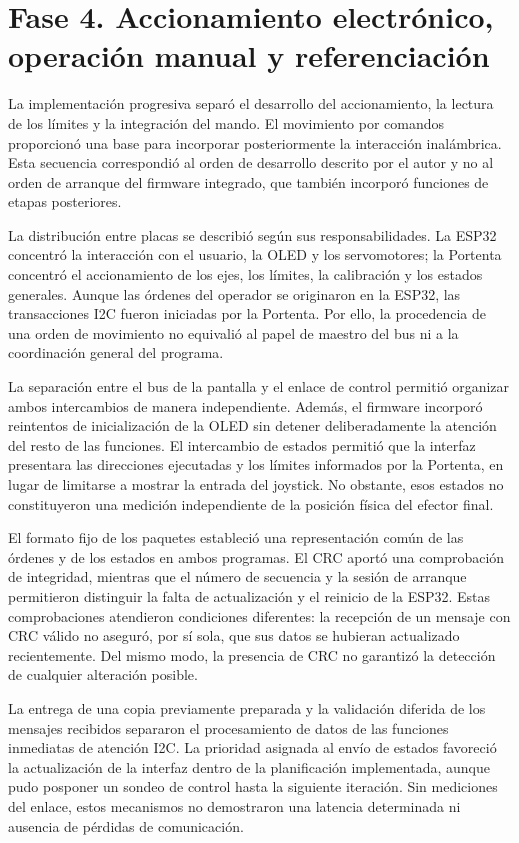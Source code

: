 \section{Fase 4. Accionamiento electrónico, operación manual y referenciación}
\label{sec:discusion_fase4}

La implementación progresiva separó el desarrollo del accionamiento, la lectura de los límites y la integración del mando. El movimiento por comandos proporcionó una base para incorporar posteriormente la interacción inalámbrica. Esta secuencia correspondió al orden de desarrollo descrito por el autor y no al orden de arranque del firmware integrado, que también incorporó funciones de etapas posteriores.

La distribución entre placas se describió según sus responsabilidades. La ESP32 concentró la interacción con el usuario, la OLED y los servomotores; la Portenta concentró el accionamiento de los ejes, los límites, la calibración y los estados generales. Aunque las órdenes del operador se originaron en la ESP32, las transacciones I2C fueron iniciadas por la Portenta. Por ello, la procedencia de una orden de movimiento no equivalió al papel de maestro del bus ni a la coordinación general del programa.

La separación entre el bus de la pantalla y el enlace de control permitió organizar ambos intercambios de manera independiente. Además, el firmware incorporó reintentos de inicialización de la OLED sin detener deliberadamente la atención del resto de las funciones. El intercambio de estados permitió que la interfaz presentara las direcciones ejecutadas y los límites informados por la Portenta, en lugar de limitarse a mostrar la entrada del joystick. No obstante, esos estados no constituyeron una medición independiente de la posición física del efector final.

El formato fijo de los paquetes estableció una representación común de las órdenes y de los estados en ambos programas. El CRC aportó una comprobación de integridad, mientras que el número de secuencia y la sesión de arranque permitieron distinguir la falta de actualización y el reinicio de la ESP32. Estas comprobaciones atendieron condiciones diferentes: la recepción de un mensaje con CRC válido no aseguró, por sí sola, que sus datos se hubieran actualizado recientemente. Del mismo modo, la presencia de CRC no garantizó la detección de cualquier alteración posible.

La entrega de una copia previamente preparada y la validación diferida de los mensajes recibidos separaron el procesamiento de datos de las funciones inmediatas de atención I2C. La prioridad asignada al envío de estados favoreció la actualización de la interfaz dentro de la planificación implementada, aunque pudo posponer un sondeo de control hasta la siguiente iteración. Sin mediciones del enlace, estos mecanismos no demostraron una latencia determinada ni ausencia de pérdidas de comunicación.

